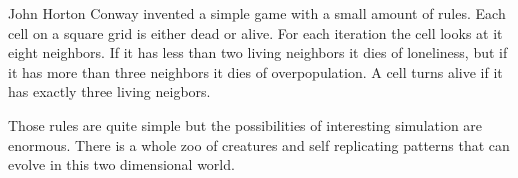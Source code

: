 
John Horton Conway invented a simple game with a small amount of rules.
Each cell on a square grid is either dead or alive. For each iteration the cell looks at it eight neighbors.
If it has less than two living neighbors it dies of loneliness, but if it has more than three neighbors it dies of overpopulation. A cell turns alive if it has exactly three living neigbors.

Those rules are quite simple but the possibilities of interesting simulation are enormous. There is a whole zoo of creatures and self replicating patterns that can evolve in this two dimensional world.


